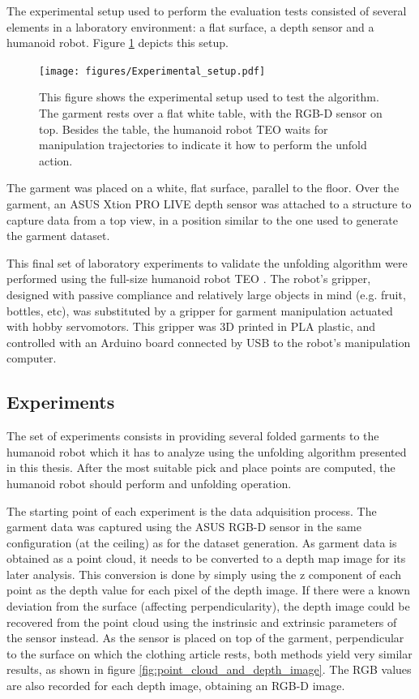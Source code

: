 The experimental setup used to perform the evaluation tests consisted of several elements in a laboratory environment: a flat surface, a depth sensor and a humanoid robot. Figure \ref{fig:experimental_setup} depicts this setup.

\begin{figure}[htbp]
    \centering
    \texttt{[image: figures/Experimental\_setup.pdf]}
    \caption[Experimental setup used to test the algorithm]
    {This figure shows the experimental setup used to test the algorithm. The garment rests over a flat white table, with the RGB-D sensor on top. Besides the table, the humanoid robot TEO waits for manipulation trajectories to indicate it how to perform the unfold action.}
    \label{fig:experimental_setup}
\end{figure}

The garment was placed on a white, flat surface, parallel to the floor. Over the garment, an ASUS Xtion PRO LIVE depth sensor was attached to a structure to capture data from a top view, in a position similar to the one used to generate the garment dataset. 

This final set of laboratory experiments to validate the unfolding algorithm were performed using the full-size humanoid robot TEO \cite{martinez2012teo}. The robot's gripper, designed with passive compliance and relatively large objects in mind (e.g. fruit, bottles, etc), was substituted by a gripper for garment manipulation actuated with hobby servomotors. This gripper was 3D printed in PLA plastic, and controlled with an Arduino board connected by USB to the robot's manipulation computer. 


\subsection{Experiments}
\label{experiments:experiments}
The set of experiments consists in providing several folded garments to the humanoid robot which it has to analyze using the unfolding algorithm presented in this thesis. After the most suitable pick and place points are computed, the humanoid robot should perform and unfolding operation.

The starting point of each experiment is the data adquisition process. The garment data was captured using the ASUS RGB-D sensor in the same configuration (at the ceiling) as for the dataset generation. As garment data is obtained as a point cloud, it needs to be converted to a depth map image for its later analysis. This conversion is done by simply using the z component of each point as the depth value for each pixel of the depth image. If there were a known deviation from the surface (affecting perpendicularity), the depth image could be recovered from the point cloud using the instrinsic and extrinsic parameters of the sensor instead. As the sensor is placed on top of the garment, perpendicular to the surface on which the clothing article rests, both methods yield very similar results, as shown in figure \ref{fig:point_cloud_and_depth_image}.
The RGB values are also recorded for each depth image, obtaining an RGB-D image.

